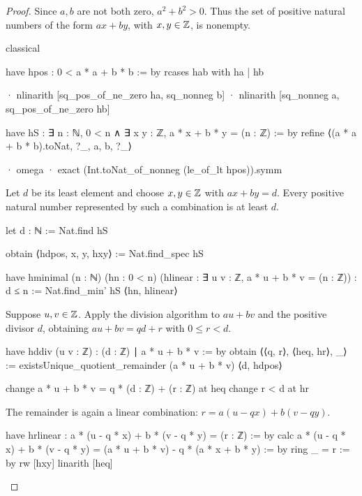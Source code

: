 \begin{proof}
  Since $a,b$ are not both zero, $a^{2}+b^{2}>0$.
  Thus the set of positive natural numbers of the form $ax+by$, with $x,y\in\mathbb{Z}$, is nonempty.

  \begin{lean}
    classical

    have hpos : 0 < a * a + b * b := by
      rcases hab with ha | hb

      · nlinarith [sq_pos_of_ne_zero ha, sq_nonneg b]
      · nlinarith [sq_nonneg a, sq_pos_of_ne_zero hb]

    have hS : ∃ n : ℕ, 0 < n ∧ ∃ x y : ℤ, a * x + b * y = (n : ℤ) := by
      refine ⟨(a * a + b * b).toNat, ?_, a, b, ?_⟩

      · omega
      · exact (Int.toNat_of_nonneg (le_of_lt hpos)).symm
  \end{lean}

  Let $d$ be its least element and choose $x,y\in\mathbb{Z}$ with $ax+by=d$.
  Every positive natural number represented by such a combination is at least $d$.

  \begin{lean}
    let d : ℕ := Nat.find hS

    obtain ⟨hdpos, x, y, hxy⟩ := Nat.find_spec hS

    have hminimal (n : ℕ) (hn : 0 < n)
        (hlinear : ∃ u v : ℤ, a * u + b * v = (n : ℤ)) : d ≤ n :=
      Nat.find_min' hS ⟨hn, hlinear⟩
  \end{lean}

  Suppose $u,v\in\mathbb{Z}$.
  Apply the division algorithm to $au+bv$ and the positive divisor $d$, obtaining $au+bv=qd+r$ with
  $0\le r<d$.

  \begin{lean}
    have hddiv (u v : ℤ) : (d : ℤ) ∣ a * u + b * v := by
      obtain ⟨⟨q, r⟩, ⟨heq, hr⟩, _⟩ :=
        existsUnique_quotient_remainder (a * u + b * v) ⟨d, hdpos⟩

      change a * u + b * v = q * (d : ℤ) + (r : ℤ) at heq
      change r < d at hr
  \end{lean}

  The remainder is again a linear combination: $r=a(u-qx)+b(v-qy)$.

  \begin{lean}
    have hrlinear : a * (u - q * x) + b * (v - q * y) = (r : ℤ) := by
      calc
        a * (u - q * x) + b * (v - q * y) =
            (a * u + b * v) - q * (a * x + b * y) := by
              ring
        _ = r := by
          rw [hxy]
          linarith [heq]
  \end{lean}


\end{proof}
